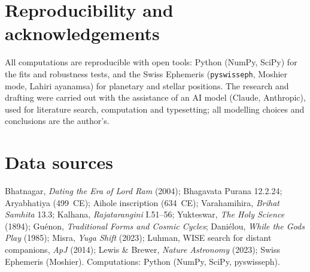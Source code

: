 \documentclass[11pt,a4paper]{article}
\begin{document}
\section*{Reproducibility and acknowledgements}
All computations are reproducible with open tools: Python (NumPy, SciPy) for the fits and robustness tests, and the Swiss Ephemeris (\texttt{pyswisseph}, Moshier mode, Lahiri ayanamsa) for planetary and stellar positions. The research and drafting were carried out with the assistance of an AI model (Claude, Anthropic), used for literature search, computation and typesetting; all modelling choices and conclusions are the author's.
\normalsize

\section*{Data sources}
\small
Bhatnagar, \emph{Dating the Era of Lord Ram} (2004); Bhagavata Purana 12.2.24; Aryabhatiya (499~CE); Aihole inscription (634~CE); Varahamihira, \emph{Brihat Samhita} 13.3; Kalhana, \emph{Rajatarangini} I.51--56; Yukteswar, \emph{The Holy Science} (1894); Gu\'enon, \emph{Traditional Forms and Cosmic Cycles}; Dani\'elou, \emph{While the Gods Play} (1985); Misra, \emph{Yuga Shift} (2023); Luhman, WISE search for distant companions, \emph{ApJ} (2014); Lewis \& Brewer, \emph{Nature Astronomy} (2023); Swiss Ephemeris (Moshier). Computations: Python (NumPy, SciPy, pyswisseph).
\end{document}
